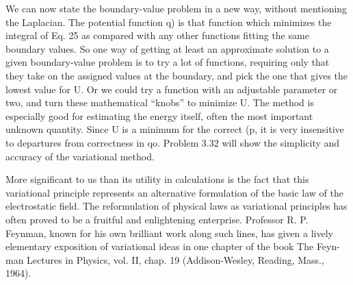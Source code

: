 We can now state the boundary-value problem in a new way,
without mentioning the Laplacian. The potential function q) is that
function which minimizes the integral of Eq. 25 as compared with any
other functions fitting the same boundary values. So one way of getting
at least an approximate solution to a given boundary-value
problem is to try a lot of functions, requiring only that they take on
the assigned values at the boundary, and pick the one that gives the
lowest value for U. Or we could try a function with an adjustable
parameter or two, and turn these mathematical ``knobs'' to minimize
U. The method is especially good for estimating the energy
itself, often the most important unknown quantity. Since U is a
minimum for the correct (p, it is very insensitive to departures from
correctness in qo. Problem 3.32 will show the simplicity and accuracy
of the variational method.

More significant to us than its utility in calculations is the fact that
this variational principle represents an alternative formulation of the
basic law of the electrostatic field. The reformulation of physical
laws as variational principles has often proved to be a fruitful and
enlightening enterprise. Professor R. P. Feynman, known for his
own brilliant work along such lines, has given a lively elementary
exposition of variational ideas in one chapter of the book The Feyn-
man Lectures in Physics, vol. II, chap. 19 (Addison-Wesley, Reading,
Mass., 1964).

\fi

